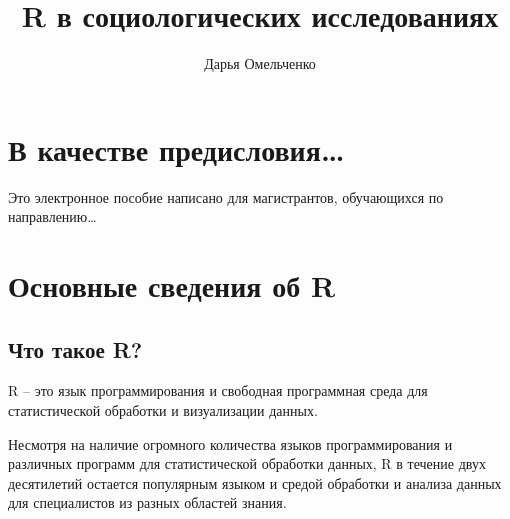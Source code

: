 \documentclass[
  letterpaper,
  DIV=11,
  numbers=noendperiod]{scrreprt}
\title{R в социологических исследованиях}
\author{Дарья Омельченко}
\date{}
\renewcommand*\contentsname{Содержание}
\newcommand\contentsname{Содержание}
\begin{document}
\maketitle
\ifdefined\Shaded\renewenvironment{Shaded}{\begin{tcolorbox}[borderline west={3pt}{0pt}{shadecolor}, interior hidden, sharp corners, frame hidden, boxrule=0pt, enhanced, breakable]}{\end{tcolorbox}}\fi

\renewcommand*\contentsname{Содержание}
{
\hypersetup{linkcolor=}
\setcounter{tocdepth}{2}
\tableofcontents
}

\hypertarget{ux432-ux43aux430ux447ux435ux441ux442ux432ux435-ux43fux440ux435ux434ux438ux441ux43bux43eux432ux438ux44f}{%
\chapter*{В качестве
предисловия\ldots{}}\label{ux432-ux43aux430ux447ux435ux441ux442ux432ux435-ux43fux440ux435ux434ux438ux441ux43bux43eux432ux438ux44f}}


Это электронное пособие написано для магистрантов, обучающихся по
направлению\ldots{}


\hypertarget{ux43eux441ux43dux43eux432ux43dux44bux435-ux441ux432ux435ux434ux435ux43dux438ux44f-ux43eux431-r}{%
\chapter{Основные сведения об
R}\label{ux43eux441ux43dux43eux432ux43dux44bux435-ux441ux432ux435ux434ux435ux43dux438ux44f-ux43eux431-r}}

\hypertarget{ux447ux442ux43e-ux442ux430ux43aux43eux435-r}{%
\section{Что такое
R?}\label{ux447ux442ux43e-ux442ux430ux43aux43eux435-r}}

R -- это язык программирования и свободная программная среда для
статистической обработки и визуализации данных.

Несмотря на наличие огромного количества языков программирования и
различных программ для статистической обработки данных, R в течение двух
десятилетий остается популярным языком и средой обработки и анализа
данных для специалистов из разных областей знания.
\end{document}

